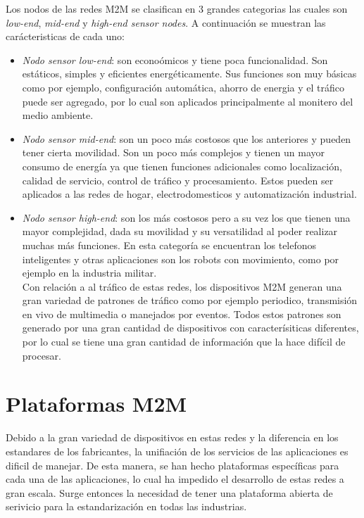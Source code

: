 \documentclass[journal]{IEEEtran}
\begin{document}
Los nodos de las redes M2M se clasifican en 3 grandes categorias las cuales son \emph{low-end}, \emph{mid-end} y \emph{high-end sensor nodes}. A continuaci\'on se muestran las car\'acteristicas de cada uno:
\begin{itemize}
\item \emph{Nodo sensor low-end}: son econo\'omicos y tiene poca funcionalidad. Son est\'aticos, simples y eficientes energ\'eticamente. Sus funciones son muy b\'asicas como por ejemplo, configuraci\'on autom\'atica, ahorro de energia y el tr\'afico puede ser agregado, por lo cual son aplicados principalmente al monitero del medio ambiente.\\

\item \emph{Nodo sensor mid-end}: son un poco m\'as costosos que los anteriores y pueden tener cierta movilidad. Son un poco m\'as complejos y tienen un mayor consumo de energ\'ia ya que tienen funciones adicionales como localizaci\'on, calidad de servicio, control de tr\'afico y procesamiento. Estos pueden ser aplicados a las redes de hogar, electrodomesticos y automatizaci\'on industrial.\\

\item \emph{Nodo sensor high-end}: son los m\'as costosos pero a su vez los que tienen una mayor complejidad, dada su movilidad y su versatilidad al poder realizar muchas m\'as funciones. En esta categor\'ia se encuentran los telefonos inteligentes y otras aplicaciones son los robots con movimiento, como por ejemplo en la industria militar.\\

Con relaci\'on a al tr\'afico de estas redes, los dispositivos M2M generan una gran variedad de patrones de tr\'afico como por ejemplo periodico, transmisi\'on en vivo de multimedia o manejados por eventos. Todos estos patrones son generado por una gran cantidad de dispositivos con caracter\'isiticas diferentes, por lo cual se tiene una gran cantidad de informaci\'on que la hace dif\'icil de procesar.



\end{itemize}


\section{Plataformas M2M }
Debido a la gran variedad de dispositivos en estas redes y la diferencia en los estandares de los fabricantes, la unifiación de los servicios de las aplicaciones es dificil de manejar. De esta manera, se han hecho plataformas espec\'ificas para cada una de las aplicaciones, lo cual ha impedido el desarrollo de estas redes a gran escala. Surge entonces la necesidad de tener una plataforma abierta de serivicio para la estandarizaci\'on en todas las industrias.\\
\end{document}
